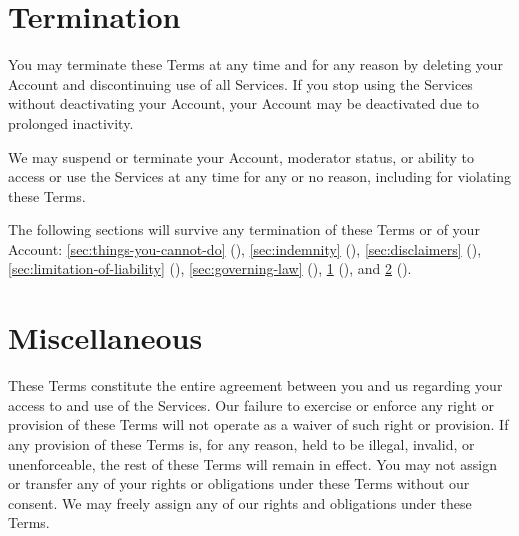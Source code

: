 \documentclass[10pt]{article}
\begin{document}
\section{Termination}
\label{sec:termination}
You may terminate these Terms at any time and for any reason by deleting your Account and discontinuing use of all Services. If you stop using the Services without deactivating your Account, your Account may be deactivated due to prolonged inactivity.

We may suspend or terminate your Account, moderator status, or ability to access or use the Services at any time for any or no reason, including for violating these Terms.

The following sections will survive any termination of these Terms or of your Account: \ref{sec:things-you-cannot-do} (), \ref{sec:indemnity} (), \ref{sec:disclaimers} (), \ref{sec:limitation-of-liability} (), \ref{sec:governing-law} (), \ref{sec:termination} (), and \ref{sec:miscellaneous} ().


\section{Miscellaneous}
\label{sec:miscellaneous}
These Terms constitute the entire agreement between you and us regarding your access to and use of the Services. Our failure to exercise or enforce any right or provision of these Terms will not operate as a waiver of such right or provision. If any provision of these Terms is, for any reason, held to be illegal, invalid, or unenforceable, the rest of these Terms will remain in effect. You may not assign or transfer any of your rights or obligations under these Terms without our consent. We may freely assign any of our rights and obligations under these Terms.
\end{document}
